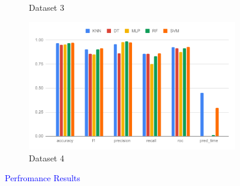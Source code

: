 \documentclass[a4paper,fleqn]{cas-dc}
\newcommand{\responsemodsm}[1]{\textcolor{blue}{#1}}
\begin{document}
\begin{figure}[H]
\begin{subfigure}{\columnwidth}
        \caption{Dataset 3}\label{fig:performance_results_dataset_3}
    \end{subfigure}
    \begin{subfigure}{\columnwidth}
        \includegraphics[width=0.9\columnwidth]{perf_ds_4.pdf}
        \caption{Dataset 4}\label{fig:performance_results_dataset_4}
    \end{subfigure}
    \caption{\responsemodsm{Perfromance Results}}\label{fig:performance_results}
\end{figure}
\end{document}
